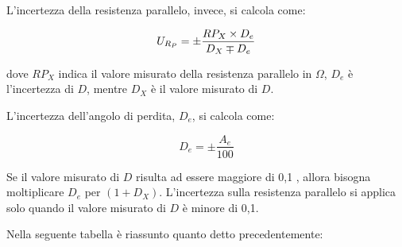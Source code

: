 L’incertezza della resistenza parallelo, invece, si calcola come:

\begin{equation}
        U_{R_P} = \pm \frac{RP_X \times D_e}{D_X \mp D_e}  \\
\end{equation}

dove $RP_X$ indica il valore misurato della resistenza parallelo in $\Omega$, $D_e$ è l’incertezza di 
$D$, mentre $D_X$ è il valore misurato di $D$.

L’incertezza dell’angolo di perdita, $D_e$, si calcola come:

\begin{equation}
    D_e = \pm \frac{A_e}{100}
\end{equation}

Se il valore misurato di $D$ risulta ad essere maggiore di 0,1 , allora bisogna 
moltiplicare $D_e$ per $(1+D_X)$. L’incertezza sulla resistenza parallelo si applica solo 
quando il valore misurato di $D$ è minore di 0,1.

Nella seguente tabella è riassunto quanto detto precedentemente:

\begin{table}[H]
\centering
{}
\caption{LCR, misura della resistenza}
\label{tab:lcr_c_RPx}
\end{table}
\FloatBarrier


